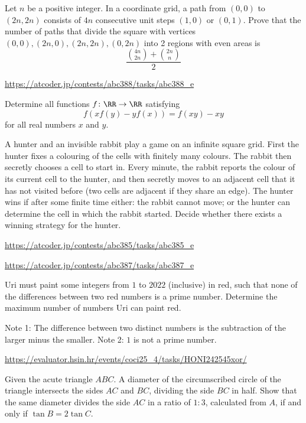 \documentclass[11pt]{scrartcl}
\begin{document}
\begin{problem}[Benelux 2024/2]
Let $n$ be a positive integer. In a coordinate grid, a path from $(0,0)$ to $(2n,2n)$ consists of $4n$ consecutive unit steps $(1,0)$ or $(0,1)$. Prove that the number of paths that divide the square with vertices $(0,0),(2n,0),(2n,2n),(0,2n)$ into 2 regions with even areas is$$\frac{{4n \choose 2n} + {2n \choose n}}{2}$$
\end{problem}
\begin{problem}[AC ABC388E]
\url{https://atcoder.jp/contests/abc388/tasks/abc388_e}
\end{problem}
\begin{problem}
  Determine all functions $f \colon \RR \to \RR$ satisfying
  \[ f\left( xf(y)-yf(x) \right) = f(xy)-xy \]
  for all real numbers $x$ and $y$.

\end{problem}
\begin{problem}
	A hunter and an invisible rabbit play a game on an infinite square grid. First the hunter fixes a colouring of the cells with finitely many colours. The rabbit then secretly chooses a cell to start in. Every minute, the rabbit reports the colour of its current cell to the hunter, and then secretly moves to an adjacent cell that it has not visited before (two cells are adjacent if they share an edge). The hunter wins if after some finite time either:
the rabbit cannot move; or
the hunter can determine the cell in which the rabbit started.
Decide whether there exists a winning strategy for the hunter.
\end{problem}
\begin{problem}[AC ABC385E]
\url{https://atcoder.jp/contests/abc385/tasks/abc385_e}
\end{problem}
\begin{problem}[AC ABC387E]
\url{https://atcoder.jp/contests/abc387/tasks/abc387_e}
\end{problem}
\begin{problem}[Argentina 2022/2.2]
Uri must paint some integers from $1$ to $2022$ (inclusive) in red, such that none of the differences between two red numbers is a prime number. Determine the maximum number of numbers Uri can paint red.

Note 1: The difference between two distinct numbers is the subtraction of the larger minus the smaller.
Note 2: $1$ is not a prime number.
\end{problem}
\begin{problem}[COCI 2024/R4.C]
\url{https://evaluator.hsin.hr/events/coci25_4/tasks/HONI242545xor/}
\end{problem}
\begin{problem}[Swedish 2015/1]
Given the acute triangle $ABC$. A diameter of the circumscribed circle of the triangle intersects the sides $AC$ and $BC$, dividing the side $BC$ in half. Show that the same diameter divides the side $AC$ in a ratio of $1: 3$, calculated from $A$, if and only if $\tan B = 2 \tan C$.
\end{problem}
\end{document}
